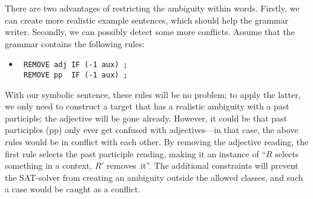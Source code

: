 There are two advantages of restricting the ambiguity within words.
Firstly, we can create more realistic example sentences, which should help the grammar writer.
Secondly, we can possibly detect some more conflicts. Assume that the grammar contains the following rules:

 \begin{itemize}
 \item[] 
\begin{verbatim}
 REMOVE adj IF (-1 aux) ;
 REMOVE pp  IF (-1 aux) ;
 \end{verbatim}
 \end{itemize}

 With our symbolic sentence, these rules will be no problem; to apply the latter, we only need to construct a target that has a realistic ambiguity with a past participle; the adjective will be gone already.
However, it could be that past participles (pp) only ever get confused with adjectives---in that case, the above rules would be in conflict with each other.
 By removing the adjective reading, the first rule selects the past participle reading, making it an instance of ``$R$ selects something in a context, $R'$ removes~it''. 
The additional constraints will prevent the SAT-solver from creating an ambiguity outside the allowed classes, and such a case would be caught as a conflict.


